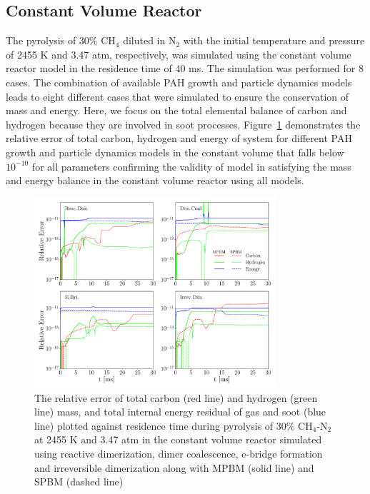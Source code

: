 \subsection{Constant Volume Reactor}
The pyrolysis of 30\% $\mathrm{CH_4}$ diluted in $\mathrm{N_2}$ with the initial temperature and pressure of 2455 K and 3.47 atm, respectively, was simulated using the constant volume reactor model in the residence time of 40 ms. The simulation was performed for 8 cases. The combination of available PAH growth and particle dynamics models leads to eight different cases that were simulated to ensure the conservation of mass and energy. Here, we focus on the total elemental balance of carbon and hydrogen because they are involved in soot processes. %
Figure~\ref{fig:constuvvalid} demonstrates the relative error of total carbon, hydrogen and energy of system for different PAH growth and particle dynamics models in the constant volume that falls below $\mathrm{10^{-10}}$ for all parameters confirming the validity of model in satisfying the mass and energy balance in the constant volume reactor using all models. 

\begin{figure}[!htbp]
	\centering
	\includegraphics[width=0.8\textwidth]{Figures/Results/Validation/ConstUV/relerr_constuv.pdf}
	\caption{The relative error of total carbon (red line) and hydrogen (green line) mass, and total internal energy residual of gas and soot (blue line) plotted against residence time during pyrolysis of 30\% $\mathrm{CH_4}$-$\mathrm{N_2}$ at 2455 K and 3.47 atm in the constant volume reactor simulated using reactive dimerization, dimer coalescence, e-bridge formation and irreversible dimerization along with MPBM (solid line) and SPBM (dashed line)}
	\label{fig:constuvvalid}
\end{figure}

